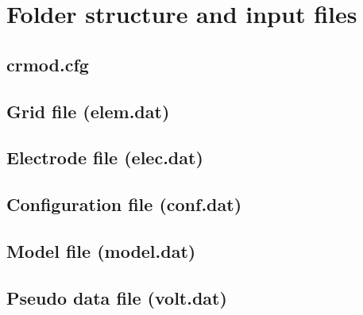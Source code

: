 \section{Folder structure and input files}\label{sect:crmod_dir}
\subsection{crmod.cfg}\label{sub:crmod_input}
\subsection{Grid file (elem.dat)}\label{sub:crmod_grid}
\subsection{Electrode file (elec.dat)}\label{sub:crmod_elec}
\subsection{Configuration file (conf.dat)}\label{sub:crmod_conf}
\subsection{Model file (model.dat)}\label{sub:crmod_modl}
\subsection{Pseudo data file (volt.dat)}\label{sub:crmod_volt}
